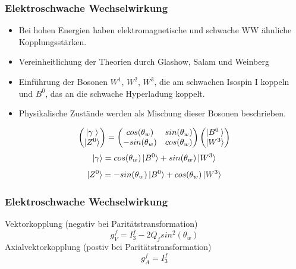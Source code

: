\begin{frame}
	\frametitle{Elektroschwache Wechselwirkung}
	\begin{center}
		\begin{itemize}
			\item
			Bei hohen Energien haben elektromagnetische und schwache WW ähnliche Kopplungsstärken.
			\item
			Vereinheitlichung der Theorien durch Glashow, Salam und Weinberg
			\item
			Einführung der Bosonen $W^1$, $W^2$, $W^3$, die am schwachen Isospin I koppeln und $B^0$, das an die schwache Hyperladung koppelt.
			\item
			Physikalische Zustände werden als Mischung dieser Bosonen beschrieben.
		\end{itemize}
		\begin{equation*}
		\begin{pmatrix}
		\ket{\gamma\;}\\
		\ket{Z^0}
		\end{pmatrix} = 
		\begin{pmatrix}
		cos(\theta_w) & sin(\theta_w)\\
		-sin(\theta_w) & cos(\theta_w)\\
		\end{pmatrix}
		\begin{pmatrix}
		\ket{B^0\:}\\
		\ket{W^3}
		\end{pmatrix}
		\end{equation*}
		\begin{equation*}
			\ket{\gamma} =  cos(\theta_w)\ket{B^0} + sin(\theta_w) \ket{W^3}
		\end{equation*}
		\begin{equation*}
		\ket{Z^0} = -sin(\theta_w) \ket{B^0} + cos(\theta_w) \ket{W^3}
		\end{equation*}
	\end{center}
\end{frame}

\begin{frame}
	\begin{center}
	\frametitle{Elektroschwache Wechselwirkung}
	Vektorkopplung (negativ bei Paritätstransformation)
	\begin{equation*}
	g_V^f = I^f_3-2 Q_f sin^2(\theta_w)
	\end{equation*}
	Axialvektorkopplung (postiv bei Paritätstransformation)
	\begin{equation*}
	g_A^f = I^f_3
	\end{equation*}
\end{center}
\end{frame}
